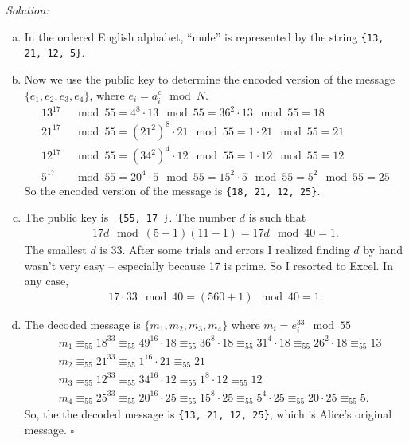 \documentclass{book}
\theoremstyle{definition}
\newcommand{\nn}{\nonumber}
\begin{document}
\noindent \textit{Solution:} 



\begin{enumerate}[(a)]
	\item In the ordered English alphabet, ``mule'' is represented by the string \texttt{\{13, 21, 12, 5\}}. 
	
	
	\item Now we use the public key to determine the encoded version of the message $\{e_1,e_2,e_3,e_4\}$, where $e_i = a_i^c \mod N$.
	\begin{align}
	13^{17} &\mod 55 = 4^8\cdot 13\mod 55=  36^2\cdot 13\mod 55=  18\nn\\
	21^{17} &\mod 55 = (21^2)^8\cdot 21\mod 55  = 1\cdot 21\mod 55 = 21 \nn\\
	12^{17} &\mod 55 =(34^2)^4\cdot 12\mod 55 = 1\cdot 12\mod 55 = 12\nn \\
	5^{17} &\mod 55 =  20^4\cdot 5 \mod 55 = 15^2\cdot 5\mod 55  = 5^2\mod 55  = 25\nn 
	\end{align} 
	So the encoded version of the message is \texttt{\{18, 21, 12, 25\}}.
	
	
	
	\item The public key is \texttt{ \{55, 17	\}}. The number $d$ is such that
	\begin{align}
	17 d \mod (5-1)(11-1) = 17d\mod 40 = 1. 
	\end{align}
	The smallest $d$ is $\boxed{33}$. After some trials and errors I realized finding $d$ by hand wasn't very easy -- especially because 17 is prime. So I resorted to Excel. In any case, 
	\begin{align}
	17\cdot 33 \mod 40 = (560 + 1)\mod 40 = 1.
	\end{align}
	
	
	\item The decoded message is $\{ m_1,m_2,m_3,m_4\} $ where $m_i = e_i^{33} \mod 55$
	\begin{align}
	&m_1 \equiv_{55} 18^{33} \equiv_{55} 49^{16}\cdot 18 \equiv_{55} 36^8\cdot 18 \equiv_{55} 31^4 \cdot 18 \equiv_{55} 26^2\cdot 18 \equiv_{55}  13\nn\\
	&m_2\equiv_{55} 21^{33} \equiv_{55} 1^{16}\cdot 21 \equiv_{55} 21\nn\\
	&m_3\equiv_{55} 12^{33} \equiv_{55} 34^16\cdot 12 \equiv_{55} 1^8 \cdot 12 \equiv_{55} 12\nn \\
	&m_4\equiv_{55} 25^{33} \equiv_{55} 20^{16}\cdot 25 \equiv_{55} 15^8 \cdot 25 \equiv_{55} 5^4\cdot 25\equiv_{55} 20\cdot 25 \equiv_{55} 5.
	\end{align}
	So, the the decoded message is \texttt{\{13, 21, 12, 25\}}, which is Alice's original message. \hfill $\square$
\end{enumerate}
\end{document}
